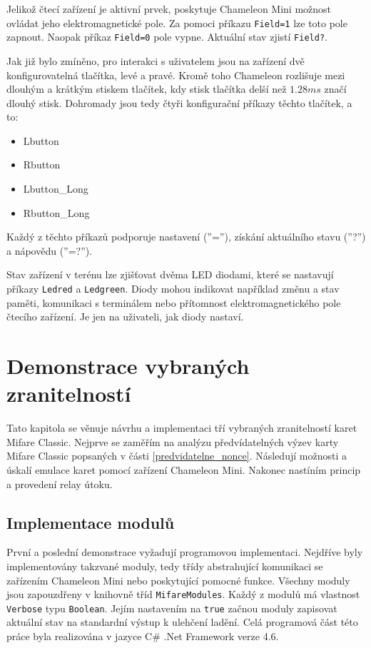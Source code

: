 Jelikož čtecí zařízení je aktivní prvek, poskytuje Chameleon Mini možnost ovládat jeho elektromagnetické pole. Za pomoci příkazu \verb|Field=1| lze toto pole zapnout. Naopak příkaz \verb|Field=0| pole vypne. Aktuální stav zjistí \verb|Field?|.\par
Jak již bylo zmíněno, pro interakci s uživatelem jsou na zařízení dvě konfigurovatelná tlačítka, levé a pravé. Kromě toho Chameleon rozlišuje mezi dlouhým a krátkým stiskem tlačítek, kdy stisk tlačítka delší než $1.28ms$ značí dlouhý stisk. Dohromady jsou tedy čtyři konfigurační příkazy těchto tlačítek, a to:
\begin{itemize}
\item Lbutton
\item Rbutton
\item {Lbutton\_Long}
\item {Rbutton\_Long}
\end{itemize}
Každý z těchto příkazů podporuje nastavení (''=''), získání aktuálního stavu (''?'') a nápovědu (''=?''). \par
Stav zařízení v terénu lze zjišťovat dvěma LED diodami, které se nastavují příkazy \verb|Ledred| a \verb|Ledgreen|. Diody mohou indikovat například změnu a stav paměti, komunikaci s terminálem nebo přítomnost elektromagnetického pole čtecího zařízení. Je jen na uživateli, jak diody nastaví.\cite{ChameleonDocs}

    \chapter{Demonstrace vybraných zranitelností}
Tato kapitola se věnuje návrhu a implementaci tří vybraných zranitelností karet Mifare Classic. Nejprve se zaměřím na analýzu předvídatelných výzev karty Mifare Classic popsaných v části \ref{predvidatelne_nonce}. Následují možnosti a úskalí emulace karet pomocí zařízení Chameleon Mini. Nakonec nastíním princip a provedení relay útoku.\par 

\section{Implementace modulů}
\label{implementaceModulu}
První a poslední demonstrace vyžadují programovou implementaci. Nejdříve byly implementovány takzvané moduly, tedy třídy abstrahující komunikaci se zařízením Chameleon Mini nebo poskytující pomocné funkce. Všechny moduly jsou zapouzdřeny v knihovně tříd \verb|MifareModules|. Každý z modulů má vlastnost \verb|Verbose| typu \verb|Boolean|. Jejím nastavením na \verb|true| začnou moduly zapisovat aktuální stav na standardní výstup k ulehčení ladění. Celá programová část této práce byla realizována v jazyce C\# .Net Framework verze 4.6.

